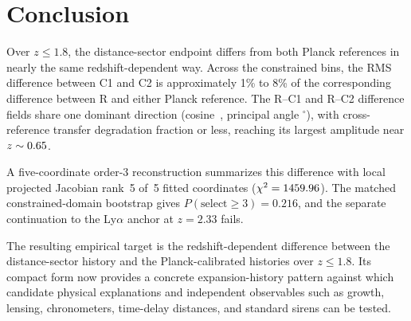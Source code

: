 \section{Conclusion}
\label{sec:conclusion}

Over $z\le1.8$, the distance-sector endpoint differs from both Planck references in nearly the same redshift-dependent way. Across the constrained bins, the RMS difference between C1 and C2 is approximately 1\% to 8\% of the corresponding difference between R and either Planck reference. The R–C1 and R–C2 difference fields share one dominant direction (cosine~\GeometryCosineSimilarity{}, principal angle \GeometryPrincipalAngle$^{\circ}$), with cross-reference transfer degradation fraction \GeometryTransferDegradation{} or less, reaching its largest amplitude near $z\sim0.65{}$.

A five-coordinate order-3 reconstruction summarizes this difference with local projected Jacobian rank~5 of~5 fitted coordinates ($\chi^{2}=1459.96{}$). The matched constrained-domain bootstrap gives $P(\mathrm{select}\ge3)=0.216$, and the separate continuation to the Ly$\alpha$ anchor at $z=2.33$ fails.

The resulting empirical target is the redshift-dependent difference between the distance-sector history and the Planck-calibrated histories over $z\le1.8$. Its compact form now provides a concrete expansion-history pattern against which candidate physical explanations and independent observables such as growth, lensing, chronometers, time-delay distances, and standard sirens can be tested.
